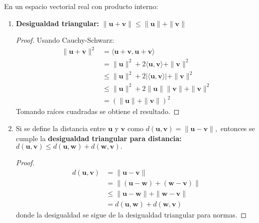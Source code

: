 \begin{theorem}
En un espacio vectorial real con producto interno:
\begin{enumerate}
    \item \textbf{Desigualdad triangular:} $\|\mathbf{u} + \mathbf{v}\| \leq \|\mathbf{u}\| + \|\mathbf{v}\|$
    \begin{proof}
    Usando Cauchy-Schwarz:
    \begin{align*}
    \|\mathbf{u} + \mathbf{v}\|^2 &= \langle \mathbf{u} + \mathbf{v}, \mathbf{u} + \mathbf{v} \rangle \\
    &= \|\mathbf{u}\|^2 + 2\langle \mathbf{u}, \mathbf{v} \rangle + \|\mathbf{v}\|^2 \\
    &\leq \|\mathbf{u}\|^2 + 2|\langle \mathbf{u}, \mathbf{v} \rangle| + \|\mathbf{v}\|^2 \\
    &\leq \|\mathbf{u}\|^2 + 2\|\mathbf{u}\|\|\mathbf{v}\| + \|\mathbf{v}\|^2 \\
    &= (\|\mathbf{u}\| + \|\mathbf{v}\|)^2
    \end{align*}
    Tomando raíces cuadradas se obtiene el resultado.
    \end{proof}
    
    \item Si se define la distancia entre $\mathbf{u}$ y $\mathbf{v}$ como  $d(\mathbf{u}, \mathbf{v}) = \|\mathbf{u} - \mathbf{v}\|,$ entonces se cumple la \textbf{desigualdad triangular para distancia:} $d(\mathbf{u}, \mathbf{v}) \leq d(\mathbf{u}, \mathbf{w}) + d(\mathbf{w}, \mathbf{v}).$
    \begin{proof}
    \begin{align*}
    d(\mathbf{u}, \mathbf{v}) &= \|\mathbf{u} - \mathbf{v}\| \\
    &= \|(\mathbf{u} - \mathbf{w}) + (\mathbf{w} - \mathbf{v})\| \\
    &\leq \|\mathbf{u} - \mathbf{w}\| + \|\mathbf{w} - \mathbf{v}\| \\
    &= d(\mathbf{u}, \mathbf{w}) + d(\mathbf{w}, \mathbf{v})
    \end{align*}
    donde la desigualdad se sigue de la desigualdad triangular para normas.
    \end{proof}
\end{enumerate}
\end{theorem}

